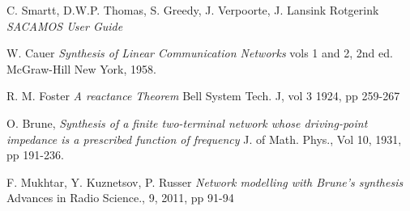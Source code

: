 \begin{thebibliography}{9}

C. Smartt, D.W.P. Thomas, S. Greedy, J. Verpoorte, J. Lansink Rotgerink
\textsl{SACAMOS User Guide}

W. Cauer
\textsl{Synthesis of Linear Communication Networks}
vols 1 and 2, 2nd ed. McGraw-Hill New York, 1958.

R. M. Foster
\textsl{A reactance Theorem}
Bell System Tech. J, vol 3 1924, pp 259-267

O. Brune,
\textsl{Synthesis of a finite two-terminal network whose driving-point impedance is a prescribed function of frequency}
J. of Math. Phys., Vol 10, 1931, pp 191-236.

F. Mukhtar, Y. Kuznetsov, P. Russer
\textsl{Network modelling with Brune's synthesis}
Advances in Radio Science., 9,  2011, pp 91-94

\end{thebibliography}


